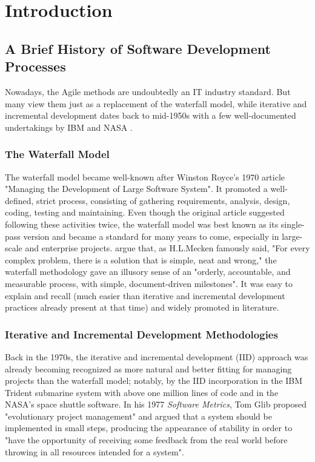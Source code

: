 \documentclass{article}
\begin{document}
\section{Introduction}
\subsection{A Brief History of Software Development Processes}
Nowadays, the Agile methods are undoubtedly an IT industry standard. But many view them just as a replacement of the waterfall model, while iterative and incremental development dates back to mid-1950s with a few well-documented undertakings by IBM and NASA \citep{larman2003iterative}.

\subsubsection{The Waterfall Model}
The waterfall model became well-known after Winston Royce's 1970 article "Managing the Development of Large Software System". It promoted a well-defined, strict process, consisting of gathering requirements, analysis, design, coding, testing and maintaining. Even though the original article suggested following these activities twice, the waterfall model was best known as its single-pass version and became a standard for many years to come, especially in large-scale and enterprise projects. \cite{larman2003iterative} argue that, as H.L.Mecken famously said, "For every complex problem, there is a solution that is simple, neat and wrong," the waterfall methodology gave an illusory sense of an "orderly, accountable, and measurable process, with simple, document-driven milestones". It was easy to explain and recall (much easier than iterative and incremental development practices already present at that time) and widely promoted in literature.

\subsubsection{Iterative and Incremental Development Methodologies}
Back in the 1970s, the iterative and incremental development (IID) approach was already becoming recognized as more natural and better fitting for managing projects than the waterfall model; notably, by the IID incorporation in the IBM Trident submarine system with above one million lines of code and in the NASA's space shuttle software. In his 1977 \textit{Software Metrics}, Tom Glib proposed "evolutionary project management" and argued that a system should be implemented in small steps, producing the appearance of stability in order to "have the opportunity of receiving some feedback from the real world before throwing in all resources intended for a system".\citep{glib1977,p.214}
\end{document}
